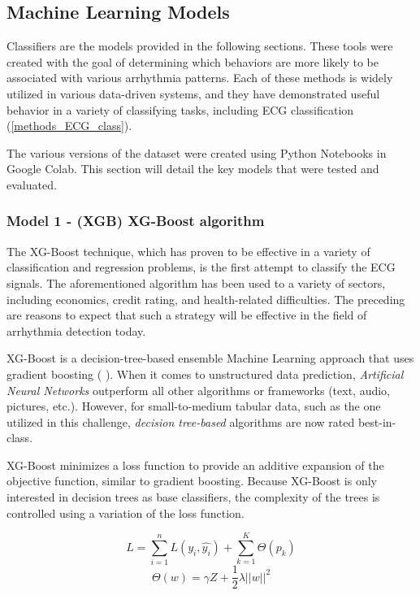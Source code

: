 \subsection{Machine Learning Models} \label{3mlmodels}

Classifiers are the models provided in the following sections. These tools were created with the goal of determining which behaviors are more likely to be associated with various arrhythmia patterns. Each of these methods is widely utilized in various data-driven systems, and they have demonstrated useful behavior in a variety of classifying tasks, including ECG classification (\ref{methods_ECG_class}).

The various versions of the dataset were created using Python Notebooks in Google Colab. This section will detail the key models that were tested and evaluated.

\subsubsection{Model 1 - (XGB) XG-Boost algorithm} \label{3model1}

The XG-Boost technique, which has proven to be effective in a variety of classification and regression problems, is the first attempt to classify the ECG signals. The aforementioned algorithm has been used to a variety of sectors, including economics, credit rating, and health-related difficulties. The preceding are reasons to expect that such a strategy will be effective in the field of arrhythmia detection today.

XG-Boost is a decision-tree-based ensemble Machine Learning approach that uses gradient boosting (\cite{xgb1} \cite{xgb2}). When it comes to unstructured data prediction, \textit{Artificial Neural Networks} outperform all other algorithms or frameworks (text, audio, pictures, etc.). However, for small-to-medium tabular data, such as the one utilized in this challenge, \textit{decision tree-based} algorithms are now rated best-in-class.

XG-Boost minimizes a loss function to provide an additive expansion of the objective function, similar to gradient boosting. Because XG-Boost is only interested in decision trees as base classifiers, the complexity of the trees is controlled using a variation of the loss function.

\begin{equation}
L = \sum_{i=1}^{n}{L(y_i,\hat{y_i})}+\sum_{k=1}^{K}{\Theta(p_k)}
\end{equation}
\begin{equation}
\Theta(w)=\gamma Z+\frac{1}{2} \lambda ||w||^2
\end{equation}

